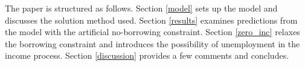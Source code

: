 The paper is structured as follows. Section \ref{model} sets up the model and discusses the solution method used. Section \ref{results} examines predictions from the model with the artificial no-borrowing constraint. Section \ref{zero_inc} relaxes the borrowing constraint and introduces the possibility of unemployment in the income process. Section \ref{discussion} provides a few comments and concludes.